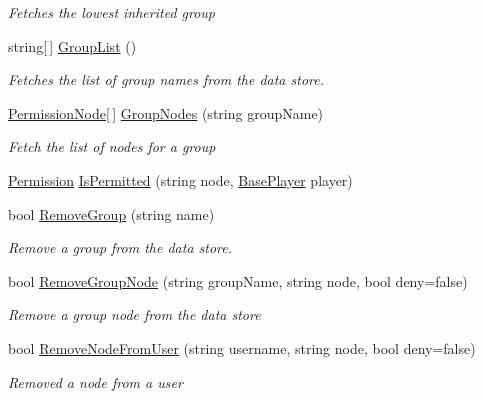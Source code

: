 \begin{DoxyCompactItemize}
\begin{DoxyCompactList}\small\item\em Fetches the lowest inherited group \end{DoxyCompactList}\item 
string\mbox{[}$\,$\mbox{]} \hyperlink{interfaceOTA_1_1Data_1_1IPermissionHandler_a488da3e7293c8cc87ed8389688393936}{Group\+List} ()
\begin{DoxyCompactList}\small\item\em Fetches the list of group names from the data store. \end{DoxyCompactList}\item 
\hyperlink{structOTA_1_1Data_1_1PermissionNode}{Permission\+Node}\mbox{[}$\,$\mbox{]} \hyperlink{interfaceOTA_1_1Data_1_1IPermissionHandler_abba44859f06092527e6856b8bc035312}{Group\+Nodes} (string group\+Name)
\begin{DoxyCompactList}\small\item\em Fetch the list of nodes for a group \end{DoxyCompactList}\item 
\hyperlink{namespaceOTA_1_1Data_a5335d23d62bc219ccbf40b018c002e8d}{Permission} \hyperlink{interfaceOTA_1_1Data_1_1IPermissionHandler_a9f1eaccdce7bdd07256ea0cf8db1f545}{Is\+Permitted} (string node, \hyperlink{classOTA_1_1BasePlayer}{Base\+Player} player)
\item 
bool \hyperlink{interfaceOTA_1_1Data_1_1IPermissionHandler_a5771b519c8b205c55749f263b43cd5e5}{Remove\+Group} (string name)
\begin{DoxyCompactList}\small\item\em Remove a group from the data store. \end{DoxyCompactList}\item 
bool \hyperlink{interfaceOTA_1_1Data_1_1IPermissionHandler_a07de3f553d2454cee6b27be1a8330d38}{Remove\+Group\+Node} (string group\+Name, string node, bool deny=false)
\begin{DoxyCompactList}\small\item\em Remove a group node from the data store \end{DoxyCompactList}\item 
bool \hyperlink{interfaceOTA_1_1Data_1_1IPermissionHandler_a99324990eac13ba50b530bbb2a28bd1e}{Remove\+Node\+From\+User} (string username, string node, bool deny=false)
\begin{DoxyCompactList}\small\item\em Removed a node from a user \end{DoxyCompactList}\item 

\end{DoxyCompactItemize}
